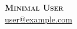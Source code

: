\documentclass[letterpaper,11pt]{article}
\begin{document}
\begin{center}
    \textbf{\Huge \scshape Minimal User} \\ \vspace{1pt}
    \small \href{mailto:user@example.com}{\underline{user@example.com}}
\end{center}
\end{document}
